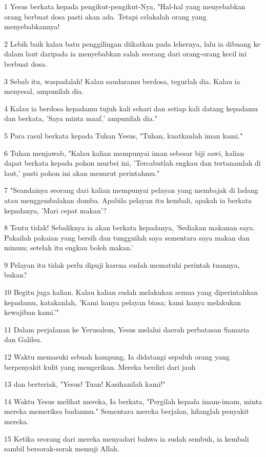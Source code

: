\par 1 Yesus berkata kepada pengikut-pengikut-Nya, "Hal-hal yang menyebabkan orang berbuat dosa pasti akan ada. Tetapi celakalah orang yang menyebabkannya!
\par 2 Lebih baik kalau batu penggilingan diikatkan pada lehernya, lalu ia dibuang ke dalam laut daripada ia menyebabkan salah seorang dari orang-orang kecil ini berbuat dosa.
\par 3 Sebab itu, waspadalah! Kalau saudaramu berdosa, tegurlah dia. Kalau ia menyesal, ampunilah dia.
\par 4 Kalau ia berdosa kepadamu tujuh kali sehari dan setiap kali datang kepadamu dan berkata, 'Saya minta maaf,' ampunilah dia."
\par 5 Para rasul berkata kepada Tuhan Yesus, "Tuhan, kuatkanlah iman kami."
\par 6 Tuhan menjawab, "Kalau kalian mempunyai iman sebesar biji sawi, kalian dapat berkata kepada pohon murbei ini, 'Tercabutlah engkau dan tertanamlah di laut,' pasti pohon ini akan menurut perintahmu."
\par 7 "Seandainya seorang dari kalian mempunyai pelayan yang membajak di ladang atau menggembalakan domba. Apabila pelayan itu kembali, apakah ia berkata kepadanya, 'Mari cepat makan'?
\par 8 Tentu tidak! Sebaliknya ia akan berkata kepadanya, 'Sediakan makanan saya. Pakailah pakaian yang bersih dan tungguilah saya sementara saya makan dan minum; setelah itu engkau boleh makan.'
\par 9 Pelayan itu tidak perlu dipuji karena sudah mematuhi perintah tuannya, bukan?
\par 10 Begitu juga kalian. Kalau kalian sudah melakukan semua yang diperintahkan kepadamu, katakanlah, 'Kami hanya pelayan biasa; kami hanya melakukan kewajiban kami.'"
\par 11 Dalam perjalanan ke Yerusalem, Yesus melalui daerah perbatasan Samaria dan Galilea.
\par 12 Waktu memasuki sebuah kampung, Ia didatangi sepuluh orang yang berpenyakit kulit yang mengerikan. Mereka berdiri dari jauh
\par 13 dan berteriak, "Yesus! Tuan! Kasihanilah kami!"
\par 14 Waktu Yesus melihat mereka, Ia berkata, "Pergilah kepada imam-imam, minta mereka memeriksa badanmu." Sementara mereka berjalan, hilanglah penyakit mereka.
\par 15 Ketika seorang dari mereka menyadari bahwa ia sudah sembuh, ia kembali sambil bersorak-sorak memuji Allah.
